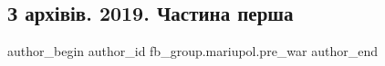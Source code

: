  
 
 
 
 

\subsection{З архівів. 2019. Частина перша}
\label{sec:07_02_2023.fb.fb_group.mariupol.pre_war.2.z_arkh_v_v__2019__ch}

\ifcmt
 author_begin
   author_id fb_group.mariupol.pre_war
 author_end
\fi
